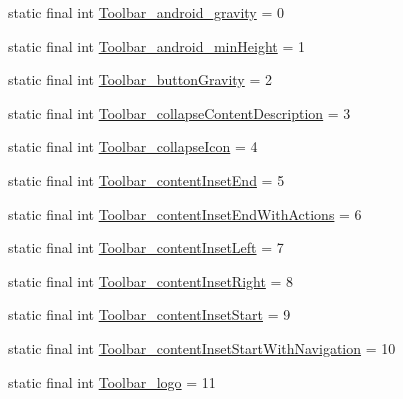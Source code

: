 \begin{DoxyCompactItemize}
\item 
static final int \mbox{\hyperlink{classandroid_1_1support_1_1v7_1_1appcompat_1_1R_1_1styleable_a84a79bd8c687a1eef63dda96bb410f01}{Toolbar\+\_\+android\+\_\+gravity}} = 0
\item 
static final int \mbox{\hyperlink{classandroid_1_1support_1_1v7_1_1appcompat_1_1R_1_1styleable_a3b8399b2cca0ff98749346ebd5d6bf70}{Toolbar\+\_\+android\+\_\+min\+Height}} = 1
\item 
static final int \mbox{\hyperlink{classandroid_1_1support_1_1v7_1_1appcompat_1_1R_1_1styleable_a2733cf58d3beef3449da4e6eba007a0b}{Toolbar\+\_\+button\+Gravity}} = 2
\item 
static final int \mbox{\hyperlink{classandroid_1_1support_1_1v7_1_1appcompat_1_1R_1_1styleable_a3734d32ea95a0b5d4bf4bff52ec5c6c0}{Toolbar\+\_\+collapse\+Content\+Description}} = 3
\item 
static final int \mbox{\hyperlink{classandroid_1_1support_1_1v7_1_1appcompat_1_1R_1_1styleable_a04b9e91185914dcad81da762ac83b99e}{Toolbar\+\_\+collapse\+Icon}} = 4
\item 
static final int \mbox{\hyperlink{classandroid_1_1support_1_1v7_1_1appcompat_1_1R_1_1styleable_aecbe2eaa8751ce5821a8e641d2eb9584}{Toolbar\+\_\+content\+Inset\+End}} = 5
\item 
static final int \mbox{\hyperlink{classandroid_1_1support_1_1v7_1_1appcompat_1_1R_1_1styleable_ad02fa08b47505549c358225345d747ff}{Toolbar\+\_\+content\+Inset\+End\+With\+Actions}} = 6
\item 
static final int \mbox{\hyperlink{classandroid_1_1support_1_1v7_1_1appcompat_1_1R_1_1styleable_a9708be86160ef8cd90d97a2335c4deaa}{Toolbar\+\_\+content\+Inset\+Left}} = 7
\item 
static final int \mbox{\hyperlink{classandroid_1_1support_1_1v7_1_1appcompat_1_1R_1_1styleable_a9e40d33c2ba6473ca0c5301d5f1f9b4a}{Toolbar\+\_\+content\+Inset\+Right}} = 8
\item 
static final int \mbox{\hyperlink{classandroid_1_1support_1_1v7_1_1appcompat_1_1R_1_1styleable_a8277724d6d61a0810ffe598e5aa92c49}{Toolbar\+\_\+content\+Inset\+Start}} = 9
\item 
static final int \mbox{\hyperlink{classandroid_1_1support_1_1v7_1_1appcompat_1_1R_1_1styleable_ad3a26b18e2dcb44a65bac712d9ff3b6d}{Toolbar\+\_\+content\+Inset\+Start\+With\+Navigation}} = 10
\item 
static final int \mbox{\hyperlink{classandroid_1_1support_1_1v7_1_1appcompat_1_1R_1_1styleable_aa6cd97acb16dc1939297d6b55144511a}{Toolbar\+\_\+logo}} = 11

\end{DoxyCompactItemize}

